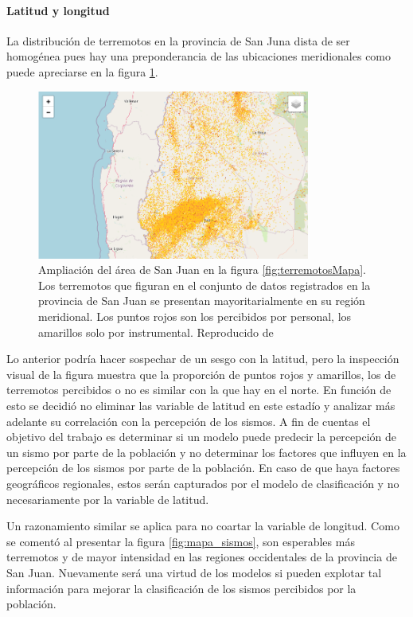 \documentclass[a4paper]{report}
\begin{document}
\paragraph{Latitud y longitud}
La distribución de terremotos en la provincia de San Juna dista de ser homogénea pues hay una preponderancia de las ubicaciones meridionales como puede apreciarse en la figura \ref{fig:sanJuan}. 
\begin{figure}[!h]
\centering
\includegraphics[width=0.8\textwidth]{sanJuan.png}
\caption{Ampliación del área de San Juan en la figura \ref{fig:terremotosMapa}.
	Los terremotos que figuran en el conjunto de datos registrados en la provincia de San Juan se presentan mayoritarialmente en su región meridional.
	Los puntos rojos son los percibidos por personal, los amarillos solo por instrumental. 
	Reproducido de \cite{daniela_parada_ic-datasets-docencia_nodate}}
\label{fig:sanJuan}
\end{figure}

Lo anterior podría hacer sospechar de un sesgo con la latitud, pero la inspección visual de la figura muestra que la proporción de puntos rojos y amarillos, los de terremotos percibidos o no es similar con la que hay en el norte.
En función de esto se decidió no eliminar las variable de latitud en este estadío y analizar más adelante su correlación con la percepción de los sismos.
A fin de cuentas el objetivo del trabajo es determinar si un modelo puede predecir la percepción de un sismo por parte de la población y no determinar los factores que influyen en la percepción de los sismos por parte de la población.
En caso de que haya factores geográficos regionales, estos serán capturados por el modelo de clasificación y no necesariamente por la variable de latitud.

Un razonamiento similar se aplica para no coartar la variable de longitud.
Como se comentó al presentar la figura \ref{fig:mapa_sismos}, son esperables más terremotos y de mayor intensidad en las regiones occidentales de la provincia de San Juan.
Nuevamente será una virtud de los modelos si pueden explotar tal información para mejorar la clasificación de los sismos percibidos por la población.
\end{document}
